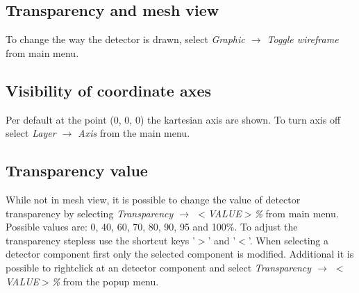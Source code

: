 \documentclass[a4paper,10pt]{article}
\begin{document}
\subsection{Transparency and mesh view}
To change the way the detector is drawn, select \textit{Graphic $\rightarrow$ Toggle wireframe} from main menu.
\subsection{Visibility of coordinate axes}
Per default at the point (0, 0, 0) the kartesian axis are shown.
To turn axis off select \textit{Layer $\rightarrow$ Axis} from the main menu.


\subsection{Transparency value}
While not in mesh view, it is possible to change the value of detector transparency by selecting \textit{Transparency $\rightarrow$ $<$VALUE$>$\%} from main menu. 
Possible values are: 0, 40, 60, 70, 80, 90, 95 and 100\%.
To adjust the transparency stepless use the shortcut keys '$>$' and '$<$'. 
When selecting a detector component first only the selected component is modified. 
Additional it is possible to rightclick at an detector component and select \textit{Transparency $\to$ $<$VALUE$>$\%} from the popup menu.


%
\end{document}
